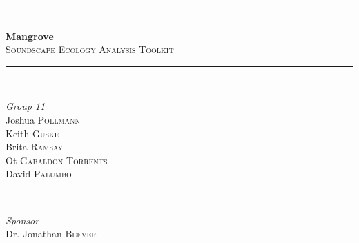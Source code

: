 \begin{titlepage} %
  \newcommand{\HRule}{\rule{\linewidth}{0.5mm}} %

  \center %






  \HRule\\[0.4cm]

  {\fontsize{50}{50}\bfseries Mangrove}\\[0.4cm] %
  {\large\textsc{Soundscape Ecology Analysis Toolkit}}\\[0.2cm] %

  \HRule\\[1.5cm]


  \begin{minipage}{0.4\textwidth}
    \begin{flushleft}
      \large
      \textit{Group 11}\\
      Joshua \textsc{Pollmann}\\
      Keith \textsc{Guske}\\
      Brita \textsc{Ramsay}\\
      Ot \textsc{Gabaldon Torrents}\\
      David \textsc{Palumbo}\\
    \end{flushleft}
  \end{minipage}
  ~
  \begin{minipage}{0.4\textwidth}
    \begin{flushright}
      \large
      \textit{Sponsor}\\
      Dr. Jonathan \textsc{Beever} %
    \end{flushright}
  \end{minipage}


\end{titlepage}
